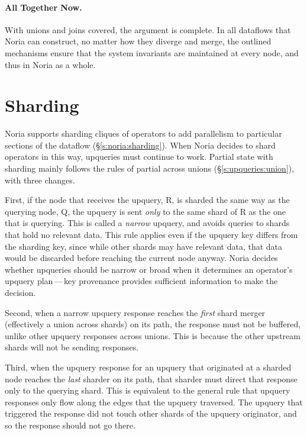 \paragraph{All Together Now.}
%
With unions and joins covered, the argument is complete. In all dataflows that
Noria can construct, no matter how they diverge and merge, the outlined
mechanisms ensure that the system invariants are maintained at every node, and
thus in Noria as a whole.

\section{Sharding}
\label{s:challenge:sharding}

Noria supports sharding cliques of operators to add parallelism to particular
sections of the dataflow (\S\ref{s:noria:sharding}). When Noria decides to shard
operators in this way, upqueries must continue to work. Partial state with
sharding mainly follows the rules of partial across unions
(\S\ref{s:upqueries:union}), with three changes.

First, if the node that receives the upquery, R, is sharded the same way as the
querying node, Q, the upquery is sent \emph{only} to the same shard of R as the
one that is querying. This is called a \textit{narrow} upquery, and avoids
queries to shards that hold no relevant data. This rule applies even if the
upquery key differs from the sharding key, since while other shards may have
relevant data, that data would be discarded before reaching the current node
anyway. Noria decides whether upqueries should be narrow or broad when it
determines an operator's upquery plan\,---\,key provenance provides sufficient
information to make the decision.

Second, when a narrow upquery response reaches the \emph{first} shard merger
(effectively a union across shards) on its path, the response must not be
buffered, unlike other upquery responses across unions. This is because
the other upstream shards will not be sending responses.

Third, when the upquery response for an upquery that originated at a sharded
node reaches the \emph{last} sharder on its path, that sharder must direct that
response only to the querying shard. This is equivalent to the general rule that
upquery responses only flow along the edges that the upquery traversed. The
upquery that triggered the response did not touch other shards of the upquery
originator, and so the response should not go there.


